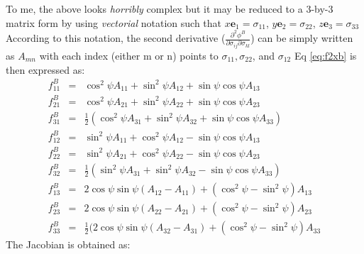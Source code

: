 \documentclass[12pt]{amsart}
\begin{document}
To me, the above looks \emph{horribly} complex but it may be reduced to a 3-by-3 matrix form by using \emph{vectorial} notation such that $x \boldsymbol{e}_{1}=\sigma_{11}$, $y\boldsymbol{e}_2=\sigma_{22}$, $z\boldsymbol{e}_3=\sigma_{33}$
According to this notation, the second derivative ($\frac{\partial^2\phi^B}{\partial\sigma_{ij}\partial\sigma_{kl}}$) can be simply written as $A_{mn}$ with each index (either m or n) points to $\sigma_{11},\sigma_{22}$, and $\sigma_{12}$
Eq \ref{eq:f2xb} is then expressed as:
\begin{eqnarray}
  \label{eq:f2xb_2}
  f^B_{11} &=&            \cos^2\psi A_{11} + \sin^2\psi A_{12} + \sin\psi\cos\psi A_{13}\\
  f^B_{21} &=&            \cos^2\psi A_{21} + \sin^2\psi A_{22} + \sin\psi\cos\psi A_{23}\nonumber\\
  f^B_{31} &=&\frac{1}{2}(\cos^2\psi A_{31} + \sin^2\psi A_{32} + \sin\psi\cos\psi A_{33})\nonumber\\
  f^B_{12} &=&            \sin^2\psi A_{11} + \cos^2\psi A_{12} - \sin\psi\cos\psi A_{13}\nonumber\\
  f^B_{22} &=&            \sin^2\psi A_{21} + \cos^2\psi A_{22} - \sin\psi\cos\psi A_{23}\nonumber\\
  f^B_{32} &=&\frac{1}{2}(\sin^2\psi A_{31} + \sin^2\psi A_{32} - \sin\psi\cos\psi A_{33})\nonumber\\
  f^B_{13} &=&2\cos\psi\sin\psi(A_{12}-A_{11})+(\cos^2\psi-\sin^2\psi) A_{13}\nonumber\\
  f^B_{23} &=&2\cos\psi\sin\psi(A_{22}-A_{21})+(\cos^2\psi-\sin^2\psi) A_{23}\nonumber\\
  f^B_{33} &=& \frac{1}{2}(2\cos\psi\sin\psi(A_{32}-A_{31})+(\cos^2\psi-\sin^2\psi)A_{33}\nonumber
\end{eqnarray}
The Jacobian is obtained as:
\end{document}
